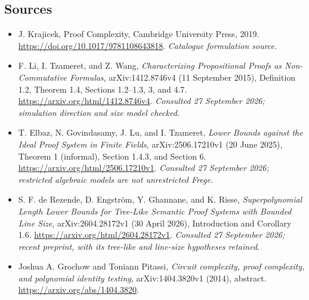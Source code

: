 \documentclass[11pt,a4paper]{article}
\numberwithin{equation}{section}
\begin{document}
\subsection{Sources}
\begin{itemize}\raggedright
\item[\textnormal{[S1]}]\hypertarget{source:statement:1}{} J. Krajicek, Proof Complexity, Cambridge University Press, 2019.
\url{https://doi.org/10.1017/9781108643818}.
{\small\textit{Catalogue formulation source.}}
\item[\textnormal{[E1]}]\hypertarget{extra:statement:1}{} F. Li, I. Tzameret, and Z. Wang,
\emph{Characterizing Propositional Proofs as Non-Commutative Formulas},
arXiv:1412.8746v4 (11 September 2015), Definition 1.2, Theorem 1.4,
Sections 1.2--1.3, 3, and 4.7.
\url{https://arxiv.org/html/1412.8746v4}.
{\small\textit{Consulted 27 September 2026; simulation direction and size model checked.}}
\item[\textnormal{[E2]}]\hypertarget{extra:statement:2}{} T. Elbaz, N. Govindasamy,
J. Lu, and I. Tzameret, \emph{Lower Bounds against the Ideal Proof System in
Finite Fields}, arXiv:2506.17210v1 (20 June 2025), Theorem 1 (informal),
Section 1.4.3, and Section 6.
\url{https://arxiv.org/html/2506.17210v1}.
{\small\textit{Consulted 27 September 2026; restricted algebraic models are not unrestricted Frege.}}
\item[\textnormal{[E3]}]\hypertarget{extra:statement:3}{} S. F. de Rezende,
D. Engstr\"om, Y. Ghannane, and K. Risse,
\emph{Superpolynomial Length Lower Bounds for Tree-Like Semantic Proof
Systems with Bounded Line Size}, arXiv:2604.28172v1 (30 April 2026),
Introduction and Corollary 1.6.
\url{https://arxiv.org/html/2604.28172v1}.
{\small\textit{Consulted 27 September 2026; recent preprint, with its tree-like and line-size hypotheses retained.}}

\item[\textnormal{[E4]}]\hypertarget{extra:statement:4}{} Joshua A. Grochow and
Toniann Pitassi, \emph{Circuit complexity, proof complexity, and polynomial
identity testing}, arXiv:1404.3820v1 (2014), abstract.
\url{https://arxiv.org/abs/1404.3820}.
\end{itemize}
\end{document}
